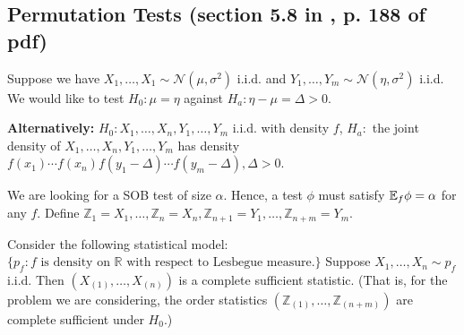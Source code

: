 \subsection{Permutation Tests (section 5.8 in \citet{lehmann2005testing}, p. 188 of pdf)}

Suppose we have \(X_1, \ldots, X_1 \sim \mathcal{N}(\mu, \sigma^2)\) i.i.d. and \(Y_1, \ldots, Y_m \sim \mathcal{N}(\eta, \sigma^2)\) i.i.d. We would like to test \(H_0: \mu = \eta\) against \(H_a: \eta - \mu = \Delta > 0\). 

\textbf{Alternatively:} \(H_0: X_1, \ldots, X_n, Y_1, \ldots, Y_m\) i.i.d. with density \(f\), \(H_a:\) the joint density of \(X_1, \ldots, X_n, Y_1, \ldots, Y_m\) has density \(f(x_1) \cdots f(x_n) f(y_1 - \Delta) \cdots f(y_m - \Delta), \Delta > 0\). 

We are looking for a SOB test of size \(\alpha\). Hence, a test \(\phi\) must satisfy \(\E_f \phi = \alpha\) for any \(f\). Define \(\mathbb{Z}_1 = X_1, \ldots, \mathbb{Z}_n = X_n, \mathbb{Z}_{n+1} = Y_1, \ldots, \mathbb{Z}_{n+m} = Y_m\).

\begin{theorem}\label{mathstats.order.stats.comp.suff}

Consider the following statistical model: \(\{p_f: f \text{ is density on } \mathbb{R} \text{ with respect to Lesbegue measure.}\}\) Suppose \(X_1, \ldots, X_n \sim p_f\) i.i.d. Then \((X_{(1)}, \ldots, X_{(n)})\) is a complete sufficient statistic. (That is, for the problem we are considering, the order statistics \((\mathbb{Z}_{(1)}, \ldots, \mathbb{Z}_{(n+m)})\) are complete sufficient under \(H_0\).)

\end{theorem}

